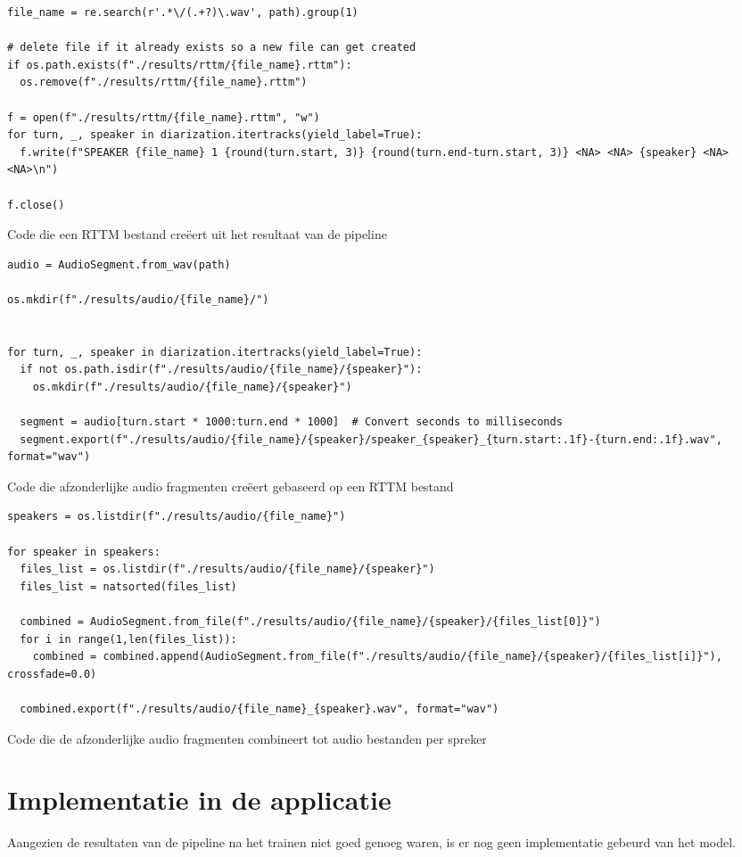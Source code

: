 \begin{listing}
	\begin{verbatim}
file_name = re.search(r'.*\/(.+?)\.wav', path).group(1)

# delete file if it already exists so a new file can get created
if os.path.exists(f"./results/rttm/{file_name}.rttm"):
  os.remove(f"./results/rttm/{file_name}.rttm")

f = open(f"./results/rttm/{file_name}.rttm", "w")
for turn, _, speaker in diarization.itertracks(yield_label=True):
  f.write(f"SPEAKER {file_name} 1 {round(turn.start, 3)} {round(turn.end-turn.start, 3)} <NA> <NA> {speaker} <NA> <NA>\n")

f.close()
	\end{verbatim}
	\caption[Code om RTTM bestand te creëren]{\label{code:maak-rttm}Code die een RTTM bestand creëert uit het resultaat van de pipeline}
\end{listing}

\begin{listing}
	\begin{verbatim}
audio = AudioSegment.from_wav(path)

os.mkdir(f"./results/audio/{file_name}/")


for turn, _, speaker in diarization.itertracks(yield_label=True):
  if not os.path.isdir(f"./results/audio/{file_name}/{speaker}"):
    os.mkdir(f"./results/audio/{file_name}/{speaker}")

  segment = audio[turn.start * 1000:turn.end * 1000]  # Convert seconds to milliseconds
  segment.export(f"./results/audio/{file_name}/{speaker}/speaker_{speaker}_{turn.start:.1f}-{turn.end:.1f}.wav", format="wav")
	\end{verbatim}
	\caption[Code om korte audio bestanden te creëren]{\label{code:korte-bestanden}Code die afzonderlijke audio fragmenten creëert gebaseerd op een RTTM bestand}
\end{listing}

\begin{listing}
	\begin{verbatim}
speakers = os.listdir(f"./results/audio/{file_name}")

for speaker in speakers:
  files_list = os.listdir(f"./results/audio/{file_name}/{speaker}")
  files_list = natsorted(files_list)

  combined = AudioSegment.from_file(f"./results/audio/{file_name}/{speaker}/{files_list[0]}")
  for i in range(1,len(files_list)):
    combined = combined.append(AudioSegment.from_file(f"./results/audio/{file_name}/{speaker}/{files_list[i]}"), crossfade=0.0)

  combined.export(f"./results/audio/{file_name}_{speaker}.wav", format="wav")
	\end{verbatim}
	\caption[Code om audio bestanden per spreker te creëren]{\label{code:audio-per-spreker}Code die de afzonderlijke audio fragmenten combineert tot audio bestanden per spreker}
\end{listing}

\section{Implementatie in de applicatie}
\label{sec:implementatie}
Aangezien de resultaten van de pipeline na het trainen niet goed genoeg waren, is er nog geen implementatie gebeurd van het model.
